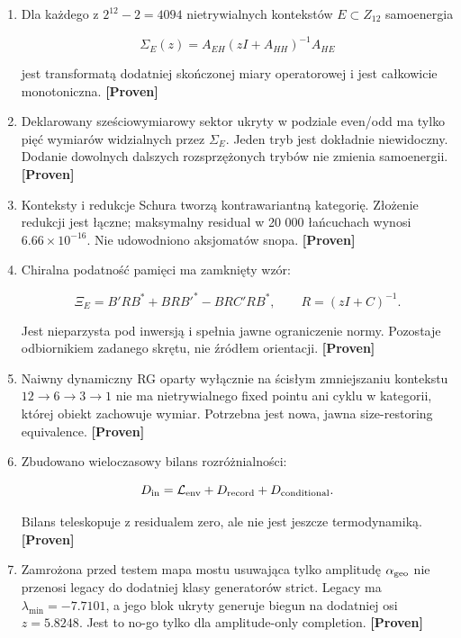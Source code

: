 \documentclass[11pt,a4paper,openany]{report}
\newcommand{\statusProven}{\textcolor{fingreen}{[Proven]}}
\begin{document}
\begin{enumerate}
\item 
Dla ka\.zdego z \(2^{12}-2=4094\) nietrywialnych kontekstów \(E\subset Z_{12}\) samoenergia

\[
   \Sigma_E(z)=A_{EH}(zI+A_{HH})^{-1}A_{HE}
   \]

jest transformatą dodatniej skończonej miary operatorowej i jest całkowicie monotoniczna. \textbf{\statusProven{}}

\item 
Deklarowany sześciowymiarowy sektor ukryty w podziale even/\allowbreak{}odd ma tylko pięć wymiarów widzialnych przez \(\Sigma_E\). Jeden tryb jest dokładnie niewidoczny. Dodanie dowolnych dalszych rozsprzę\.zonych trybów nie zmienia samoenergii. \textbf{\statusProven{}}

\item 
Konteksty i redukcje Schura tworzą kontrawariantną kategorię. Zło\.zenie redukcji jest łączne; maksymalny residual w 20 000 łańcuchach wynosi \(6.66\times10^{-16}\). Nie udowodniono aksjomatów snopa. \textbf{\statusProven{}}

\item 
Chiralna podatność pamięci ma zamknięty wzór:

\[
   \Xi_E
   =B'RB^\ast+BRB'^\ast-BRC'RB^\ast,
   \qquad R=(zI+C)^{-1}.
   \]

Jest nieparzysta pod inwersją i spełnia jawne ograniczenie normy. Pozostaje odbiornikiem zadanego skrętu, nie źródłem orientacji. \textbf{\statusProven{}}

\item 
Naiwny dynamiczny RG oparty wyłącznie na ścisłym zmniejszaniu kontekstu \(12\to6\to3\to1\) nie ma nietrywialnego fixed pointu ani cyklu w kategorii, której obiekt zachowuje wymiar. Potrzebna jest nowa, jawna size-restoring equivalence. \textbf{\statusProven{}}

\item 
Zbudowano wieloczasowy bilans rozró\.znialności:

\[
   D_{\rm in}
   =
   \mathcal L_{\rm env}
   +D_{\rm record}
   +D_{\rm conditional}.
   \]

Bilans teleskopuje z residualem zero, ale nie jest jeszcze termodynamiką. \textbf{\statusProven{}}

\item 
Zamro\.zona przed testem mapa mostu usuwająca tylko amplitudę \(\alpha_{\rm geo}\) nie przenosi legacy do dodatniej klasy generatorów strict. Legacy ma \(\lambda_{\min}=-7.7101\), a jego blok ukryty generuje biegun na dodatniej osi \(z=5.8248\). Jest to no-go tylko dla amplitude-only completion. \textbf{\statusProven{}}


\end{enumerate}
\end{document}

